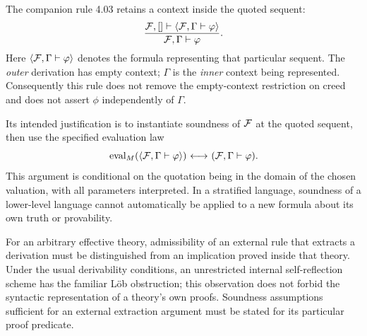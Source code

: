\begin{remark}
The companion rule 4.03 retains a context inside the quoted sequent:
\[
\frac{
{\mathcal{F}},[]\vdash\langle{\mathcal{F}},\Gamma\vdash\varphi\rangle
}{
{\mathcal{F}},\Gamma\vdash\varphi
}.
\]
Here $\langle{\mathcal{F}},\Gamma\vdash\varphi\rangle$ denotes the formula representing
that particular sequent. The \emph{outer} derivation has empty context;
$\Gamma$ is the \emph{inner} context being represented. Consequently this
rule does not remove the empty-context restriction on creed and does not
assert $\phi$ independently of $\Gamma$.

Its intended justification is to instantiate soundness of ${\mathcal{F}}$ at the
quoted sequent, then use the specified evaluation law
\[
\operatorname{eval}_M(\langle{\mathcal{F}},\Gamma\vdash\varphi\rangle)
{\ \longleftrightarrow\ } ({\mathcal{F}},\Gamma\vdash\varphi).
\]
This argument is conditional on the quotation being in the domain of the
chosen valuation, with all parameters interpreted. In a stratified language,
soundness of a lower-level language cannot automatically be applied to a
new formula about its own truth or provability.

For an arbitrary effective theory, admissibility of an external rule that
extracts a derivation must be distinguished from an implication proved
inside that theory. Under the usual derivability conditions, an unrestricted
internal self-reflection scheme has the familiar L\"ob obstruction; this
observation does not forbid the syntactic representation of a theory's own
proofs. Soundness assumptions sufficient for an external extraction argument
must be stated for its particular proof predicate.
\end{remark}


